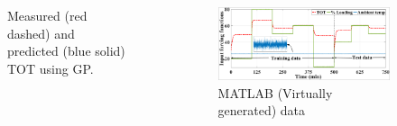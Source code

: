 \documentclass[10pt,hyperref={pdfpagelabels=false}]{beamer}
\begin{document}
\begin{frame}[fragile]
\begin{columns}
\begin{figure}
    \caption{Measured (red dashed) and predicted (blue solid) TOT using GP.}
    \label{fig:Problem_5_1_1}
\end{figure}
\begin{figure}
    \centering
    \includegraphics[scale=0.25]{Images/virtual_oil_temp_8Pages_new_OL.png}
    \caption{MATLAB (Virtually generated) data }
    \label{fig:Problem_5_1_1}
\end{figure}
\end{columns}
\end{frame}
\end{document}
